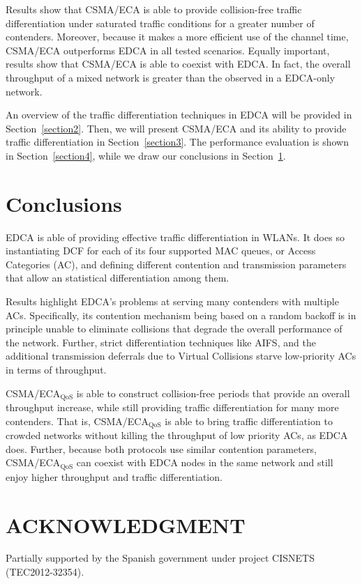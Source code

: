 \documentclass[a4paper]{article}
\begin{document}
Results show that CSMA/ECA is able to provide collision-free traffic differentiation under saturated traffic conditions for a greater number of contenders. Moreover, because it makes a more efficient use of the channel time, CSMA/ECA outperforms EDCA in all tested scenarios. Equally important, results show that CSMA/ECA is able to coexist with EDCA. In fact, the overall throughput of a mixed network is greater than the observed in a EDCA-only network.

An overview of the traffic differentiation techniques in EDCA will be provided in Section~\ref{section2}. Then, we will present CSMA/ECA and its ability to provide traffic differentiation in Section~\ref{section3}. The performance evaluation is shown in Section~\ref{section4}, while we draw our conclusions in Section~\ref{section5}.





\section{Conclusions}\label{section5}
EDCA is able of providing effective traffic differentiation in WLANs. It does so instantiating DCF for each of its four supported MAC queues, or Access Categories (AC), and defining different contention and transmission parameters that allow an statistical differentiation among them. 

Results highlight EDCA's problems at serving many contenders with multiple ACs. Specifically, its contention mechanism being based on a random backoff is in principle unable to eliminate collisions that degrade the overall performance of the network. Further, strict differentiation techniques like AIFS, and the additional transmission deferrals due to Virtual Collisions starve low-priority ACs in terms of throughput.

CSMA/ECA$_{\text{QoS}}$ is able to construct collision-free periods that provide an overall throughput increase, while still providing traffic differentiation for many more contenders. That is, CSMA/ECA$_{\text{QoS}}$ is able to bring traffic differentiation to crowded networks without killing the throughput of low priority ACs, as EDCA does. Further, because both protocols use similar contention parameters, CSMA/ECA$_{\text{QoS}}$ can coexist with EDCA nodes in the same network and still enjoy higher throughput and traffic differentiation.

\section*{ACKNOWLEDGMENT}
Partially supported by the Spanish government under project CISNETS (TEC2012-32354).



\end{document}
